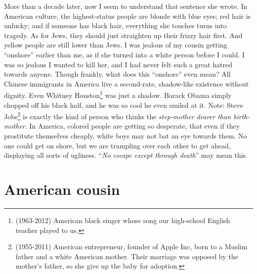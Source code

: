 \documentclass[12pt]{report}
\begin{document}
{More than a decade later, now I seem to understand that sentence she wrote.  In American culture, the highest-status people are blonde with blue eyes;  red hair is unlucky;  and if someone has black hair, everything she touches turns into tragedy.  As for Jews, they should just straighten up their frizzy hair first.  And yellow people are still lower than Jews.  I was jealous of my cousin getting ``onshore'' earlier than me, as if she turned into a white person before I could.  I was so jealous I wanted to kill her, and I had never felt such a great hatred towards anyone.  Though frankly, what does this ``onshore'' even mean?  All Chinese immigrants in America live a second-rate, shadow-like existence without dignity.  Even Whitney Houston\footnote{(1963-2012) American black singer whose song our high-school English teacher played to us.} was just a shadow.  Barack Obama simply chopped off his black half, and he was so cool he even smiled at it.  Note:  Steve Jobs\footnote{(1955-2011) American entrepreneur, founder of Apple Inc, born to a Muslim father and a white American mother.  Their marriage was opposed by the mother's father, so she give up the baby for adoption.} is exactly the kind of person who thinks the \textit{step-mother dearer than birth-mother}.  In America, colored people are getting so desperate, that even if they prostitute themselves cheaply, white boys may not bat an eye towards them.  No one could get on shore, but we are trampling over each other to get ahead, displaying all sorts of ugliness.  ``\textit{No escape except through death}'' may mean this.
}

\chapter{American cousin}
\end{document}
